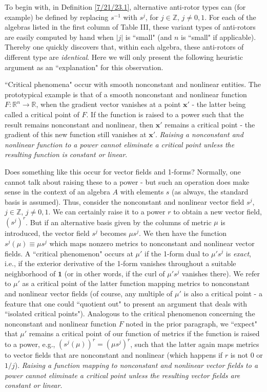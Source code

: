 \documentclass{amsart}
\numberwithin{equation}{section}
\theoremstyle{definition}
\numberwithin{theorem}{section}
\begin{document}
  To begin with, in Definition \ref{7/21/23.1}, alternative anti-rotor types can (for example) be defined by replacing $s^{-1}$ with $s^j$, for $j\in\mathbb{Z}$, $j\ne 0,1$.  For each of the algebras listed in the first column of Table III, these variant types of anti-rotors are easily computed by hand when  $|j|$ is ``small" (and $n$ is ``small" if applicable).  
Thereby one quickly discovers that, within each algebra, these anti-rotors of different type are {\it identical}.  
Here we will only present the following heuristic argument as an ``explanation" for this observation.

``Critical phenomena" occur with smooth nonconstant and nonlinear entities.  The prototypical example is that of a smooth nonconstant and nonlinear function $F:\mathbb{R}^n\rightarrow \mathbb{R}$, when the gradient vector vanishes at a point $\mathbf{x'}$ - the latter being called a critical point of $F$.  If the function is raised to a power such that the result remains nonconstant and nonlinear, then $\mathbf{x'}$ remains a critical point - the gradient of this new function still vanishes at $\mathbf{x'}$.   {\it Raising a nonconstant and nonlinear function to a power cannot eliminate a critical point unless the resulting function is constant or linear}.  

Does something like this occur for vector fields and 1-forms?  Normally, one cannot talk about raising these to a power - but such an operation does make sense in the context of an algebra $A$ with elements $s$ (as always, the standard basis is assumed).  Thus, consider the nonconstant and nonlinear vector field $s^j$, $j\in \mathbb{Z}$, \mbox{$j\ne 0,1$}. We can certainly raise it to a power $r$ to obtain a new vector field, $(s^j)^r$.  But if an alternative basis given by the columns of metric $\mu$ is introduced, the vector field $s^j$ becomes $\mu s^j$.  We then have the function $s^j(\mu)\equiv \mu s^j$ which maps nonzero metrics to nonconstant and nonlinear vector fields.  A ``critical phenomenon" occurs at $\mu'$ if the 1-form dual to $\mu' s^j$ is {\it exact}, i.e., if the exterior derivative of the 1-form vanishes throughout a suitable neighborhood of $\mathbf{1}$ (or in other words, if the curl of $\mu' s^j$ vanishes there).  We refer to $\mu'$ as a critical point of the latter function mapping metrics to nonconstant and nonlinear vector fields (of course, any multiple of $\mu'$ is also a critical point - a feature that one could ``quotient out" to present an argument that deals with ``isolated critical points").  Analogous to the critical phenomenon concerning the nonconstant and nonlinear function $F$ noted in the prior paragraph, we ``expect" that $\mu'$ remains a critical point of our function of metrics if the function is raised to a power, e.g., $\left(s^j(\mu)\right)^r = (\mu s^j)^r$, such that the latter again maps metrics to vector fields that are nonconstant and nonlinear (which happens if $r$ is not 0 or $1/j$).  {\it Raising a function mapping to nonconstant and nonlinear vector fields to a power cannot eliminate a critical point unless the resulting vector fields are constant or linear}.   
\end{document}
